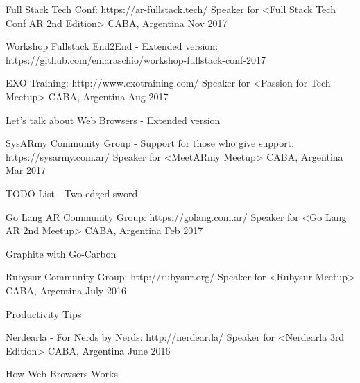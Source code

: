 
\begin{cventries}
  \cventry
    {Full Stack Tech Conf: https://ar-fullstack.tech/}
    {Speaker for <Full Stack Tech Conf AR 2nd Edition>}
    {CABA, Argentina}
    {Nov 2017}
    {
      \begin{cvitems}
        \item {Workshop Fullstack End2End - Extended version: https://github.com/emaraschio/workshop-fullstack-conf-2017}
      \end{cvitems}
    }

  \cventry
    {EXO Training: http://www.exotraining.com/ }
    {Speaker for <Passion for Tech Meetup>}
    {CABA, Argentina}
    {Aug 2017}
    {
      \begin{cvitems}
        \item {Let's talk about Web Browsers - Extended version}
      \end{cvitems}
    }

  \cventry
    {SysARmy Community Group - Support for those who give support: https://sysarmy.com.ar/ }
    {Speaker for <MeetARmy Meetup>}
    {CABA, Argentina}
    {Mar 2017}
    {
      \begin{cvitems}
        \item {TODO List - Two-edged sword}
      \end{cvitems}
    }

  \cventry
    {Go Lang AR Community Group: https://golang.com.ar/ }
    {Speaker for <Go Lang AR 2nd Meetup>}
    {CABA, Argentina}
    {Feb 2017}
    {
      \begin{cvitems}
        \item {Graphite with Go-Carbon}
      \end{cvitems}
    }

  \cventry
    {Rubysur Community Group: http://rubysur.org/}
    {Speaker for <Rubysur Meetup>}
    {CABA, Argentina}
    {July 2016}
    {
      \begin{cvitems}
        \item {Productivity Tips}
      \end{cvitems}
    }

  \cventry
    {Nerdearla - For Nerds by Nerds: http://nerdear.la/}
    {Speaker for <Nerdearla 3rd Edition>}
    {CABA, Argentina}
    {June 2016}
    {
      \begin{cvitems}
        \item {How Web Browsers Works}
      \end{cvitems}
    }


\end{cventries}
